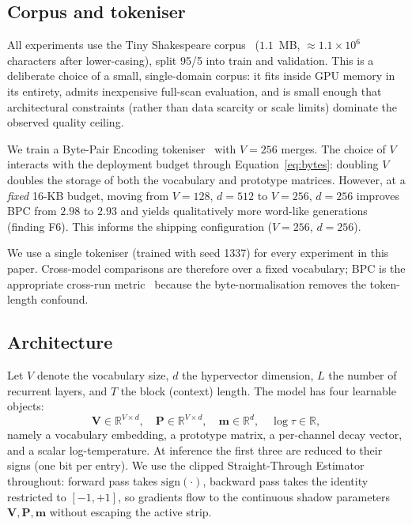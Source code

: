 \documentclass[runningheads]{llncs}
\newcommand{\bV}{\mathbf{V}}
\newcommand{\bP}{\mathbf{P}}
\newcommand{\bm}{\mathbf{m}}
\begin{document}
\subsection{Corpus and tokeniser}
\label{sec:method:data}

All experiments use the Tiny Shakespeare
corpus~\cite{karpathy2015tinyshakespeare} ($1.1$~MB, ${\approx}1.1{\times}10^6$
characters after lower-casing), split 95/5 into train and validation. This
is a deliberate choice of a small, single-domain corpus: it fits inside
GPU memory in its entirety, admits inexpensive full-scan evaluation, and
is small enough that architectural constraints (rather than data scarcity
or scale limits) dominate the observed quality ceiling.

We train a Byte-Pair Encoding tokeniser~\cite{sennrich2016bpe} with
$V=256$ merges. The choice of $V$ interacts with the deployment budget
through Equation~\ref{eq:bytes}: doubling $V$ doubles the storage of both
the vocabulary and prototype matrices. However, at a \emph{fixed} 16-KB
budget, moving from $V{=}128$, $d{=}512$ to $V{=}256$, $d{=}256$ improves
BPC from $2.98$ to $2.93$ and yields qualitatively more word-like
generations (finding F6). This informs the shipping configuration
($V{=}256$, $d{=}256$).

We use a single tokeniser (trained with seed 1337) for every experiment
in this paper. Cross-model comparisons are therefore over a fixed vocabulary;
BPC is the appropriate cross-run metric~\cite{peng2023rwkv} because the
byte-normalisation removes the token-length confound.

\subsection{Architecture}
\label{sec:method:arch}

Let $V$ denote the vocabulary size, $d$ the hypervector dimension,
$L$ the number of recurrent layers, and $T$ the block (context) length.
The model has four learnable objects:
\[
\bV \in \mathbb{R}^{V\times d}, \quad
\bP \in \mathbb{R}^{V\times d}, \quad
\bm \in \mathbb{R}^{d}, \quad
\log\tau \in \mathbb{R},
\]
namely a vocabulary embedding, a prototype matrix, a per-channel decay
vector, and a scalar log-temperature. At inference the first three are
reduced to their signs (one bit per entry). We use the clipped
Straight-Through Estimator~\cite{bengio2013estimating,courbariaux2016binaryconnect}
throughout: forward pass takes $\mathrm{sign}(\cdot)$, backward pass
takes the identity restricted to $[-1,+1]$, so gradients flow to the
continuous shadow parameters $\bV, \bP, \bm$ without escaping the
active strip.
\end{document}
